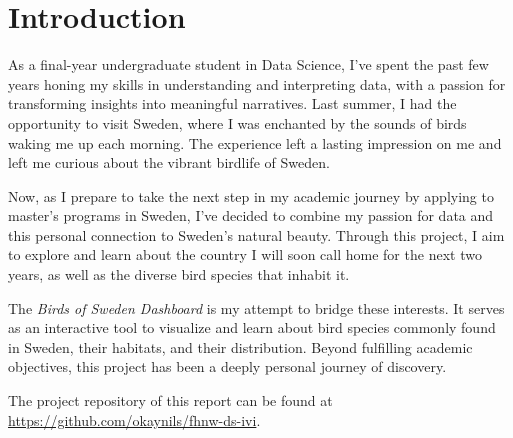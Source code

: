 \chapter{Introduction}

As a final-year undergraduate student in Data Science, I've spent the past few years honing my skills in understanding and interpreting data, with a passion for transforming insights into meaningful narratives. Last summer, I had the opportunity to visit Sweden, where I was enchanted by the sounds of birds waking me up each morning. The experience left a lasting impression on me and left me curious about the vibrant birdlife of Sweden.

Now, as I prepare to take the next step in my academic journey by applying to master's programs in Sweden, I've decided to combine my passion for data and this personal connection to Sweden's natural beauty. Through this project, I aim to explore and learn about the country I will soon call home for the next two years, as well as the diverse bird species that inhabit it.

The \textit{Birds of Sweden Dashboard} is my attempt to bridge these interests. It serves as an interactive tool to visualize and learn about bird species commonly found in Sweden, their habitats, and their distribution. Beyond fulfilling academic objectives, this project has been a deeply personal journey of discovery.

The project repository of this report can be found at \url{https://github.com/okaynils/fhnw-ds-ivi}.